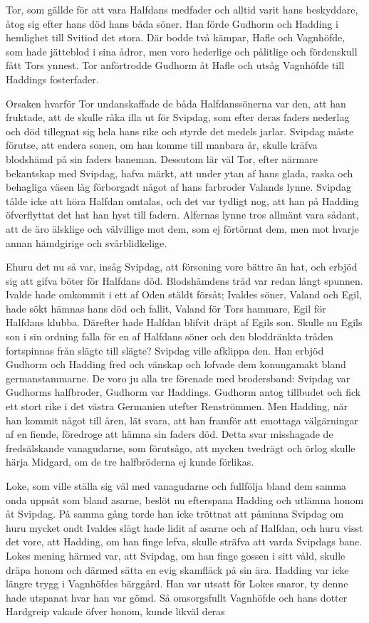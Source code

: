 Tor, som gällde för att vara Halfdans medfader och alltid varit hans
beskyddare, åtog sig efter hans död hans båda söner. Han förde Gudhorm
och Hadding i hemlighet till Svitiod det stora. Där bodde två kämpar,
Hafle och Vagnhöfde, som hade jätteblod i sina ådror, men voro hederlige
och pålitlige och fördenskull fått Tors ynnest. Tor anförtrodde Gudhorm
åt Hafle och utsåg Vagnhöfde till Haddings fosterfader.

Orsaken hvarför Tor undanskaffade de båda Halfdanssönerna var den, att
han fruktade, att de skulle råka illa ut för Svipdag, som efter deras
faders nederlag och död tillegnat sig hela hans rike och styrde det
medels jarlar. Svipdag måste förutse, att endera sonen, om han komme
till manbara år, skulle kräfva blodshämd på sin faders baneman. Dessutom
lär väl Tor, efter närmare bekantskap med Svipdag, hafva märkt, att
under ytan af hans glada, raska och behagliga väsen låg förborgadt något
af hans farbroder Valands lynne. Svipdag tålde icke att höra Halfdan
omtalas, och det var tydligt nog, att han på Hadding öfverflyttat det
hat han
hyst till fadern. Alfernas lynne tros allmänt vara sådant, att de äro
älsklige och välvillige mot dem, som ej förtörnat dem, men mot hvarje
annan hämdgirige och svårblidkelige.

Ehuru det nu så var, insåg Svipdag, att försoning vore bättre än hat,
och erbjöd sig att gifva böter för Halfdans död. Blodshämdens tråd var
redan långt spunnen. Ivalde hade omkommit i ett af Oden stäldt försåt;
Ivaldes söner, Valand och Egil, hade sökt hämnas hans död och fallit,
Valand för Tors hammare, Egil för Halfdans klubba. Därefter hade Halfdan
blifvit dräpt af Egils son. Skulle nu Egils son i sin ordning falla för
en af Halfdans söner och den bloddränkta tråden fortspinnas från slägte
till slägte? Svipdag ville afklippa den. Han erbjöd Gudhorm och Hadding
fred och vänskap och lofvade dem konungamakt bland germanstammarne. De
voro ju alla tre förenade med brodersband: Svipdag var Gudhorms
halfbroder, Gudhorm var Haddings. Gudhorm antog tillbudet och fick ett
stort rike i det västra Germanien utefter Renströmmen. Men Hadding, när
han kommit något till åren, lät svara, att han framför att emottaga
välgärningar af en fiende, föredroge att hämna sin faders död. Detta
svar misshagade de fredsälskande vanagudarne, som förutsågo, att mycken
tvedrägt och örlog skulle härja Midgard, om de tre halfbröderna ej kunde
förlikas.

Loke, som ville ställa sig väl med vanagudarne och fullfölja bland dem
samma onda uppsåt som bland asarne, beslöt nu efterspana Hadding och
utlämna honom åt Svipdag. På samma gång torde han icke tröttnat att
påminna Svipdag om huru mycket ondt Ivaldes slägt hade lidit af asarne
och af Halfdan, och huru visst det vore, att Hadding, om han finge
lefva, skulle sträfva att varda Svipdags bane. Lokes mening härmed var,
att Svipdag, om han finge gossen i sitt våld, skulle dräpa honom och
därmed sätta en evig skamfläck på sin ära. Hadding var icke längre trygg
i Vagnhöfdes bärggård. Han var utsatt för Lokes snaror, ty denne hade
utspanat hvar han var gömd. Så omsorgsfullt Vagnhöfde och hans dotter
Hardgreip vakade öfver honom, kunde likväl deras

